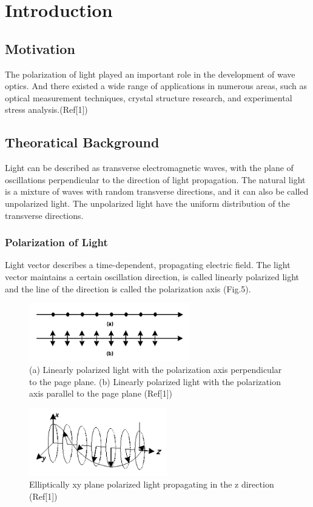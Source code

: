 \documentclass[12pt,a4paper]{article}
\begin{document}
\section{Introduction}
\subsection{Motivation}
The polarization of light played an important role in the development of wave optics. And there existed a wide range of applications in numerous areas, such as optical measurement techniques, crystal structure research, and experimental stress analysis.(Ref[1])

\subsection{Theoratical Background}
Light can be described as transverse electromagnetic waves, with the plane of oscillations perpendicular to the direction of light propagation. The natural light is a mixture of waves with random transverse directions, and it can also be called unpolarized light. The unpolarized light have the uniform distribution of the transverse directions.

\subsubsection{Polarization of Light}
Light vector describes a time-dependent, propagating electric field. The light vector maintains a certain oscillation direction, is called linearly polarized light and the line of the direction is called the polarization axis (Fig.5).\par 

\begin{figure}[H]
    \centering
    \includegraphics[width=7cm]{linearly.png}
    \caption{ (a) Linearly polarized light with the polarization axis perpendicular to the page plane. (b) Linearly polarized light with the polarization axis parallel to the page plane (Ref[1])}
    \label{linear}
\end{figure}

\begin{figure}[H]
    \centering
    \includegraphics[width=6cm]{elliptically.png}
    \caption{Elliptically xy plane polarized light propagating in the z direction (Ref[1])}
    \label{elliptically}
\end{figure}
\end{document}
